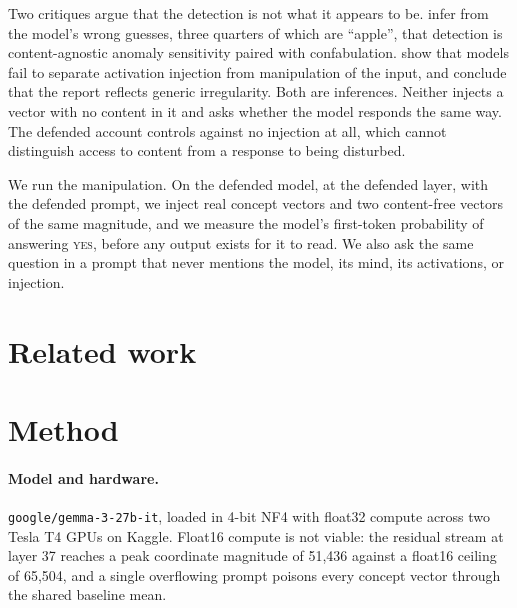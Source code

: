 \documentclass{article}
\begin{document}
Two critiques argue that the detection is not what it appears to be. \citet{lederman2026contentagnostic}
infer from the model's wrong guesses, three quarters of which are ``apple'', that detection
is content-agnostic anomaly sensitivity paired with confabulation. \citet{singh2026realitycheck}
show that models fail to separate activation injection from manipulation of the input, and
conclude that the report reflects generic irregularity. Both are inferences. Neither
injects a vector with no content in it and asks whether the model responds the same way.
The defended account controls against no injection at all, which cannot distinguish access
to content from a response to being disturbed.

We run the manipulation. On the defended model, at the defended layer, with the defended
prompt, we inject real concept vectors and two content-free vectors of the same magnitude,
and we measure the model's first-token probability of answering \textsc{yes}, before any
output exists for it to read. We also ask the same question in a prompt that never mentions
the model, its mind, its activations, or injection.


\section{Related work}


\section{Method}

\paragraph{Model and hardware.}
\texttt{google/gemma-3-27b-it}, loaded in 4-bit NF4 \citep{dettmers2023qlora} with float32
compute across two Tesla T4 GPUs on Kaggle. Float16 compute is not viable: the residual
stream at layer 37 reaches a peak coordinate magnitude of 51{,}436 against a float16 ceiling
of 65{,}504, and a single overflowing prompt poisons every concept vector through the shared
baseline mean.
\end{document}
